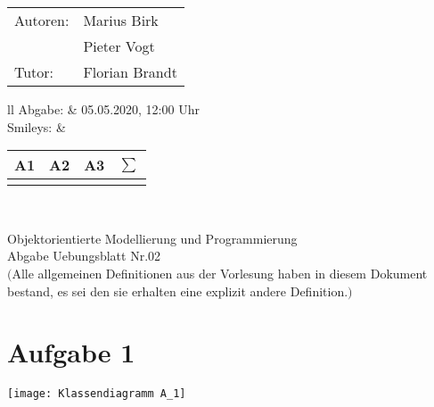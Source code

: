 \documentclass[12pt,a4paper,oneside,ngerman]{article}
\newcommand{\fach}{Objektorientierte Modellierung und Programmierung}
\newcommand{\dokumentenTitel}{Abgabe Uebungsblatt Nr.02}
\newcommand{\Abgabe}{05.05.2020, 12:00 Uhr}
\newcommand{\memberOne}{Marius Birk}
\newcommand{\memberTwo}{Pieter Vogt}
\newcommand{\tutor}{ Florian Brandt }
\begin{document}
	\thispagestyle{plain} %
	
	\begin{multicols}{2} %
		\hspace{-1cm} %
		\begin{tabular}{ll} %
			Autoren: & \memberOne \\ %
			& \memberTwo \\
			Tutor: & \tutor \\  
		\end{tabular}
		
		\columnbreak %
		\hspace{-1cm} %
		\begin{tabular}{ll} %
			Abgabe: & \Abgabe \\ %
			Smileys: &  
			\renewcommand{\arraystretch}{1.2} 
			\begin{tabular}{|p{0.8cm}|p{0.8cm}|p{0.8cm}|p{0.8cm}|}
				\hline A1 & A2 & A3 & $\sum\limits^{ }$ \\ \hline
				& & & \\ \hline    
			\end{tabular} \\
		\end{tabular}
		
	\end{multicols} %
	
	\begin{center}
		\Large{\fach} \\
		\LARGE{\dokumentenTitel} \\
		\small
		$($Alle allgemeinen Definitionen aus der Vorlesung haben in diesem Dokument bestand, es sei den sie erhalten eine explizit andere Definition.$)$
    \end{center}

	\section{Aufgabe 1}
        \texttt{[image: Klassendiagramm A\_1]}
\end{document}
